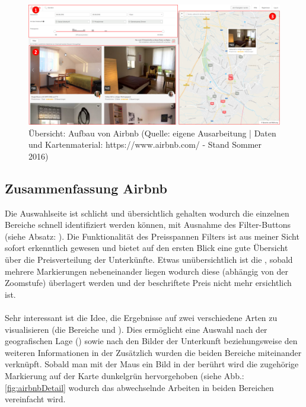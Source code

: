 \documentclass[../Bachelorarbeit.tex]{subfiles}
\begin{document}
\begin{figure}[H]
	\centering
	\includegraphics[width=1\linewidth]{img/StandDerTechnik/airbnbOverview}
	\caption[Übersicht: Aufbau von Airbnb]{Übersicht: Aufbau von Airbnb (Quelle: eigene Ausarbeitung | Daten und Kartenmaterial: https://www.airbnb.com/ - Stand Sommer 2016)}
	\label{fig:airbnbOverview}
\end{figure}

\subsection{Zusammenfassung Airbnb}
\label{airbnb:review}
Die Auswahlseite ist schlicht und übersichtlich gehalten wodurch die einzelnen Bereiche schnell identifiziert werden können, mit Ausnahme des Filter-Buttons (siehe Absatz: ). 
Die Funktionalität des Preisspannen Filters ist aus meiner Sicht sofort erkenntlich gewesen und bietet auf den ersten Blick eine gute Übersicht über die Preisverteilung der Unterkünfte.
Etwas unübersichtlich ist die , sobald mehrere Markierungen nebeneinander liegen wodurch diese (abhängig von der Zoomstufe) überlagert werden und der beschriftete Preis nicht mehr ersichtlich ist. \\
\\
Sehr interessant ist die Idee, die Ergebnisse auf zwei verschiedene Arten zu visualisieren (die Bereiche  und ).
Dies ermöglicht eine Auswahl nach der geografischen Lage () sowie nach den Bilder der Unterkunft beziehungsweise den weiteren Informationen in der 
Zusätzlich wurden die beiden Bereiche miteinander verknüpft. 
Sobald man mit der Maus ein Bild in der  berührt wird die zugehörige Markierung auf der Karte dunkelgrün hervorgehoben (siehe Abb.: \ref{fig:airbnbDetail} wodurch das abwechselnde Arbeiten in beiden Bereichen vereinfacht wird.
\end{document}
